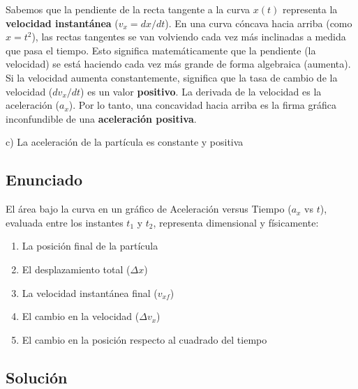 \documentclass[12pt, a4paper]{article}
\begin{document}
Sabemos que la pendiente de la recta tangente a la curva $x(t)$ representa la \textbf{velocidad instantánea} ($v_x = dx/dt$).
En una curva cóncava hacia arriba (como $x = t^2$), las rectas tangentes se van volviendo cada vez más inclinadas a medida que pasa el tiempo. Esto significa matemáticamente que la pendiente (la velocidad) se está haciendo cada vez más grande de forma algebraica (aumenta).
Si la velocidad aumenta constantemente, significa que la tasa de cambio de la velocidad ($dv_x/dt$) es un valor \textbf{positivo}. La derivada de la velocidad es la aceleración ($a_x$). Por lo tanto, una concavidad hacia arriba es la firma gráfica inconfundible de una \textbf{aceleración positiva}.

\begin{tcolorbox}[colback=green!5!white, colframe=green!50!black, title=Respuesta Final]
\centering \Large c) La aceleración de la partícula es constante y positiva
\end{tcolorbox}

\newpage

\subsection*{Enunciado}
El área bajo la curva en un gráfico de Aceleración versus Tiempo ($a_x$ vs $t$), evaluada entre los instantes $t_1$ y $t_2$, representa dimensional y físicamente:
\begin{enumerate}[label=\alph*)]
    \item La posición final de la partícula
    \item El desplazamiento total ($\Delta x$)
    \item La velocidad instantánea final ($v_{xf}$)
    \item El cambio en la velocidad ($\Delta v_x$)
    \item El cambio en la posición respecto al cuadrado del tiempo
\end{enumerate}

\subsection*{Solución}
\end{document}
